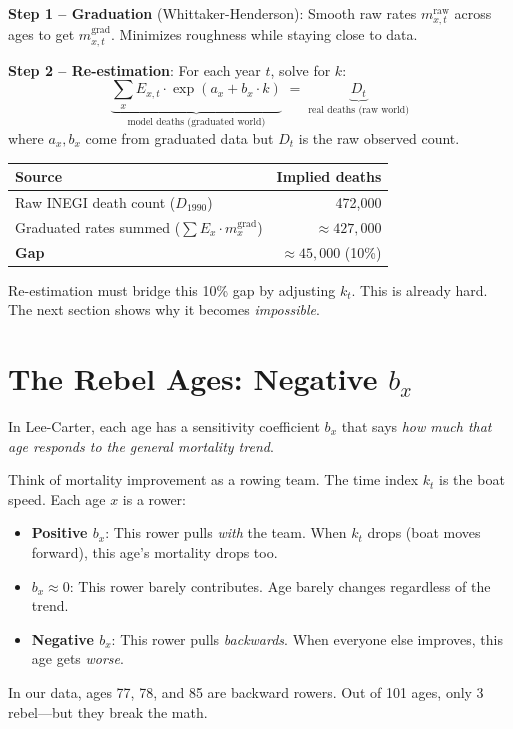 \documentclass[11pt, a4paper]{article}
\newcommand{\ax}{a_x}
\newcommand{\bx}{b_x}
\newcommand{\kt}{k_t}
\begin{document}
\begin{formaldef}
\textbf{Step 1 -- Graduation} (Whittaker-Henderson): Smooth raw rates
$m_{x,t}^{\text{raw}}$ across ages to get $m_{x,t}^{\text{grad}}$.
Minimizes roughness while staying close to data.

\medskip
\textbf{Step 2 -- Re-estimation}: For each year $t$, solve for $k$:
\[
\underbrace{\sum_x E_{x,t} \cdot \exp(\ax + \bx \cdot k)}_{\text{model deaths (graduated world)}}
\;=\;
\underbrace{D_t}_{\text{real deaths (raw world)}}
\]
where $\ax, \bx$ come from graduated data but $D_t$ is the raw
observed count.
\end{formaldef}

\begin{application}
\begin{center}
\begin{tabular}{lr}
\toprule
\textbf{Source} & \textbf{Implied deaths} \\
\midrule
Raw INEGI death count ($D_{1990}$) & 472{,}000 \\
Graduated rates summed ($\sum E_x \cdot m_x^{\text{grad}}$) & $\approx 427{,}000$ \\
\midrule
\textbf{Gap} & $\approx 45{,}000$ (10\%) \\
\bottomrule
\end{tabular}
\end{center}
Re-estimation must bridge this 10\% gap by adjusting $\kt$.
This is already hard. The next section shows why it becomes \emph{impossible}.
\end{application}


\section{The Rebel Ages: Negative $\bx$}

In Lee-Carter, each age has a sensitivity coefficient $\bx$ that says
\emph{how much that age responds to the general mortality trend}.

\begin{intuition}
Think of mortality improvement as a rowing team. The time index $\kt$
is the boat speed. Each age $x$ is a rower:

\begin{itemize}[nosep]
\item \textbf{Positive $\bx$}: This rower pulls \emph{with} the team.
  When $\kt$ drops (boat moves forward), this age's mortality drops too.
\item \textbf{$\bx \approx 0$}: This rower barely contributes. Age
  barely changes regardless of the trend.
\item \textbf{Negative $\bx$}: This rower pulls \emph{backwards}.
  When everyone else improves, this age gets \emph{worse}.
\end{itemize}

\medskip
In our data, ages 77, 78, and 85 are backward rowers.
Out of 101 ages, only 3 rebel---but they break the math.
\end{intuition}
\end{document}
